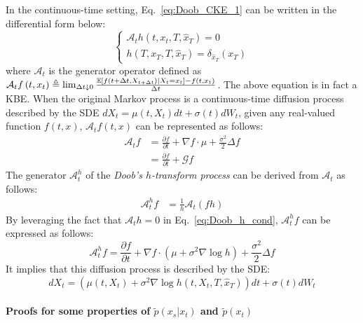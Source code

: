 In the continuous-time setting, Eq.~\ref{eq:Doob_CKE_1} can be written
in the differential form below:
\begin{equation}
\begin{cases}
\mathcal{A}_{t}h\left(t,x_{t},T,\hat{x}_{T}\right)=0\\
h\left(T,x_{T},T,\hat{x}_{T}\right)=\delta_{\hat{x}_{T}}\left(x_{T}\right)
\end{cases}\label{eq:Doob_h_cond}
\end{equation}
where $\mathcal{A}_{t}$ is the generator operator defined as $\mathcal{A}_{t}f\left(t,x_{t}\right)\triangleq\lim_{\Delta t\downarrow0}\frac{\mathbb{E}\left[f\left(t+\Delta t,X_{t+\Delta t}\right)|X_{t}=x_{t}\right]-f\left(t,x_{t}\right)}{\Delta t}$.
The above equation is in fact a KBE. When the original Markov process
is a continuous-time diffusion process described by the SDE $dX_{t}=\mu\left(t,X_{t}\right)dt+\sigma\left(t\right)dW_{t}$,
given any real-valued function $f\left(t,x\right)$, $\mathcal{A}_{t}f\left(t,x\right)$
can be represented as follows:
\begin{align*}
\mathcal{A}_{t}f & =\frac{\partial f}{\partial t}+\nabla f\cdot\mu+\frac{\sigma^{2}}{2}\Delta f\\
 & =\frac{\partial f}{\partial t}+\mathcal{G}f
\end{align*}
The generator $\mathcal{A}_{t}^{h}$ of the \emph{Doob's $h$-transform
process} can be derived from $\mathcal{A}_{t}$ as follows:
\begin{align*}
\mathcal{A}_{t}^{h}f & =\frac{1}{h}\mathcal{A}_{t}\left(fh\right)
\end{align*}
By leveraging the fact that $\mathcal{A}_{t}h=0$ in Eq.~\ref{eq:Doob_h_cond},
$\mathcal{A}_{t}^{h}f$ can be expressed as follows:
\[
\mathcal{A}_{t}^{h}f=\frac{\partial f}{\partial t}+\nabla f\cdot\left(\mu+\sigma^{2}\nabla\log h\right)+\frac{\sigma^{2}}{2}\Delta f
\]
It implies that this diffusion process is described by the SDE:
\[
dX_{t}=\left(\mu\left(t,X_{t}\right)+\sigma^{2}\nabla\log h\left(t,X_{t},T,\hat{x}_{T}\right)\right)dt+\sigma\left(t\right)dW_{t}
\]


\paragraph{Proofs for some properties of $\tilde{p}\left(x_{s}|x_{t}\right)$
and $\tilde{p}\left(x_{t}\right)$}

